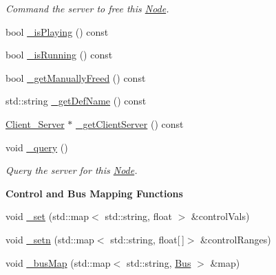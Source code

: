 \begin{DoxyCompactItemize}
\begin{DoxyCompactList}\small\item\em Command the server to free this \hyperlink{classColliderPlusPlus_1_1Node}{Node}. \end{DoxyCompactList}\item 
bool \hyperlink{classColliderPlusPlus_1_1Node_aee7913614aa6282d7113fa639e0930da}{\-\_\-is\-Playing} () const 
\item 
bool \hyperlink{classColliderPlusPlus_1_1Node_aa72353a98f6ffcce20021ad44cc05c04}{\-\_\-is\-Running} () const 
\item 
bool \hyperlink{classColliderPlusPlus_1_1Node_a64c684c140c9f5fccd64c37e1a94a25e}{\-\_\-get\-Manually\-Freed} () const 
\item 
std\-::string \hyperlink{classColliderPlusPlus_1_1Node_a47ab8ce687a4336189a6cc629cdec56d}{\-\_\-get\-Def\-Name} () const 
\item 
\hyperlink{classColliderPlusPlus_1_1Client__Server}{Client\-\_\-\-Server} $\ast$ \hyperlink{classColliderPlusPlus_1_1Node_a43f4b705ce1f66c57828ddb1083cdca0}{\-\_\-get\-Client\-Server} () const 
\item 
\hypertarget{classColliderPlusPlus_1_1Node_ae3a86f1c3960228c989cfac0c403a68f}{void \hyperlink{classColliderPlusPlus_1_1Node_ae3a86f1c3960228c989cfac0c403a68f}{\-\_\-query} ()}\label{classColliderPlusPlus_1_1Node_ae3a86f1c3960228c989cfac0c403a68f}

\begin{DoxyCompactList}\small\item\em Query the server for this \hyperlink{classColliderPlusPlus_1_1Node}{Node}. \end{DoxyCompactList}\end{DoxyCompactItemize}
\begin{Indent}{\bf Control and Bus Mapping Functions}\par
\begin{DoxyCompactItemize}
\item 
void \hyperlink{classColliderPlusPlus_1_1Node_ae5cea16e458fa9a5cd12161572b07655}{\-\_\-set} (std\-::map$<$ std\-::string, float $>$ \&control\-Vals)
\item 
void \hyperlink{classColliderPlusPlus_1_1Node_acf6441855c6e1e33fc88f3d2186842ad}{\-\_\-setn} (std\-::map$<$ std\-::string, float\mbox{[}$\,$\mbox{]}$>$ \&control\-Ranges)
\item 
void \hyperlink{classColliderPlusPlus_1_1Node_ae93e0d9cb8b20d658cdb21033a9017fe}{\-\_\-bus\-Map} (std\-::map$<$ std\-::string, \hyperlink{classColliderPlusPlus_1_1Bus}{Bus} $>$ \&map)
\end{DoxyCompactItemize}
\end{Indent}


